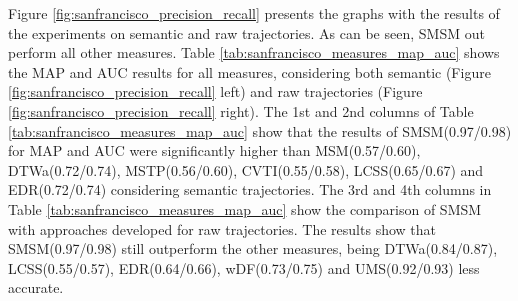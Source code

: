 \documentclass[12pt]{article}
\begin{document}
Figure {\ref{fig:sanfrancisco_precision_recall}} presents the graphs with the results of the experiments on semantic and raw trajectories. As can be seen, SMSM out perform all other measures. Table {\ref{tab:sanfrancisco_measures_map_auc}} shows the MAP and AUC results for all measures, considering both semantic (Figure \ref{fig:sanfrancisco_precision_recall} left) and raw trajectories (Figure \ref{fig:sanfrancisco_precision_recall} right). The 1st and 2nd columns of Table {\ref{tab:sanfrancisco_measures_map_auc}} show that the results of SMSM(0.97/0.98) for MAP and AUC were significantly higher than MSM(0.57/0.60), DTWa(0.72/0.74), MSTP(0.56/0.60), CVTI(0.55/0.58), LCSS(0.65/0.67) and EDR(0.72/0.74) considering semantic trajectories. The 3rd and 4th columns in Table {\ref{tab:sanfrancisco_measures_map_auc}} show the comparison of SMSM with approaches developed for raw trajectories. The results show that SMSM(0.97/0.98) still outperform the other measures, being DTWa(0.84/0.87), LCSS(0.55/0.57), EDR(0.64/0.66), wDF(0.73/0.75) and UMS(0.92/0.93) less accurate.
\end{document}
